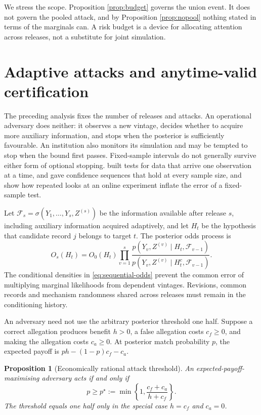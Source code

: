\documentclass[11pt,a4paper]{article}
\theoremstyle{plain}
\newtheorem{proposition}{Proposition}
\theoremstyle{definition}
\begin{document}
We stress the scope. Proposition \ref{prop:budget} governs the union event. It
does not govern the pooled attack, and by Proposition \ref{prop:nopool} nothing
stated in terms of the marginals can. A risk budget is a device for allocating
attention across releases, not a substitute for joint simulation.

\section{Adaptive attacks and anytime-valid certification}\label{sec:sequential}

The preceding analysis fixes the number of releases and attacks. An operational
adversary does neither: it observes a new vintage, decides whether to acquire more
auxiliary information, and stops when the posterior is sufficiently favourable.
An institution also monitors its simulation and may be tempted to stop when the
bound first passes. Fixed-sample intervals do not generally survive either form
of optional stopping. \citet{wald1945} built tests for data that arrive one
observation at a time, \citet{darling1967} and \citet{lai1976} gave confidence
sequences that hold at every sample size, and \citet{johari2022} show how
repeated looks at an online experiment inflate the error of a fixed-sample
test.

Let $\mathcal F_s=\sigma(Y_1,\ldots,Y_s,Z^{(s)})$ be the information available
after release $s$, including auxiliary information acquired adaptively, and let
$H_t$ be the hypothesis that candidate record $j$ belongs to target $t$. The
posterior odds process is
\begin{equation}
O_s(H_t)=O_0(H_t)\prod_{v=1}^s
\frac{p(Y_v,Z^{(v)}\mid H_t,\mathcal F_{v-1})}
     {p(Y_v,Z^{(v)}\mid H_t^c,\mathcal F_{v-1})}.
\label{eq:sequential-odds}
\end{equation}
The conditional densities in \eqref{eq:sequential-odds} prevent the common error
of multiplying marginal likelihoods from dependent vintages. Revisions, common
records and mechanism randomness shared across releases must remain in the
conditioning history.

An adversary need not use the arbitrary posterior threshold one half. Suppose a
correct allegation produces benefit $h>0$, a false allegation costs $c_f\ge0$,
and making the allegation costs $c_a\ge0$. At posterior match probability $p$,
the expected payoff is $ph-(1-p)c_f-c_a$.

\begin{proposition}[Economically rational attack threshold]
\label{prop:attack-threshold}
An expected-payoff-maximising adversary acts if and only if
\begin{equation}
p\ge p^\star:=\min\left\{1,\frac{c_f+c_a}{h+c_f}\right\}.
\label{eq:attack-threshold}
\end{equation}
The threshold equals one half only in the special case $h=c_f$ and $c_a=0$.
\end{proposition}
\end{document}
